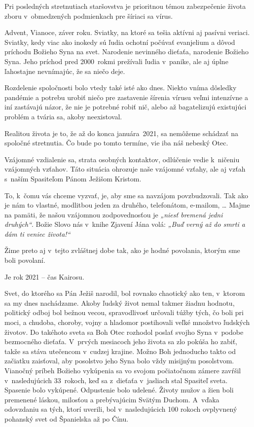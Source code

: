 

Pri posledných stretnutiach staršovstva je prioritnou témou zabezpečenie života zboru v~obmedzených podmienkach pre šíriaci sa vírus.

Advent, Vianoce, záver roku. Sviatky, na ktoré sa tešia aktívni aj pasívni veriaci. Sviatky, kedy viac ako inokedy sú ľudia ochotní počúvať evanjelium a dôvod príchodu Božieho Syna na svet. Narodenie nevinného dieťaťa, narodenie Božieho Syna. Jeho príchod pred 2000~rokmi prežívali ľudia v~panike, ale aj úplne ľahostajne nevnímajúc, že sa niečo deje.

Rozdelenie spoločnosti bolo vtedy také isté ako dnes. Niekto vníma dôsledky pandémie a potrebu urobiť niečo pre zastavenie šírenia vírusu veľmi intenzívne a iní zastávajú názor, že nie je potrebné robiť nič, alebo až bagatelizujú existujúci problém  a tvária sa, akoby neexistoval.

Realitou života je to, že až do konca januára~2021, sa nemôžeme schádzať na spoločné stretnutia. Čo bude po tomto termíne, vie iba náš nebeský Otec.

Vzájomné vzdialenie sa, strata osobných kontaktov, odlúčenie vedie k~ničeniu vzájomných vzťahov. Táto situácia ohrozuje naše vzájomné vzťahy, ale aj vzťah s~naším Spasiteľom Pánom Ježišom Kristom.

To, k~čomu vás chceme vyzvať, je, aby sme sa navzájom povzbudzovali. Tak ako je nám to vlastné, modlitbou jeden za druhého, telefonátom, e-mailom, … Majme na pamäti, že našou vzájomnou zodpovednosťou je {\it „niesť bremená jedni druhých“}. Božie Slovo nás v~knihe Zjavení Jána volá: {\it „Buď verný až do smrti a dám ti veniec života!“}

Žime preto aj v~tejto zvláštnej dobe tak, ako je hodné povolania, ktorým sme boli povolaní.

\vfill\break


Je rok 2021 -- čas Kairosu.

Svet, do ktorého sa Pán Ježiš narodil, bol rovnako chaotický ako ten, v~ktorom sa my dnes nachádzame. Akoby ľudský život nemal takmer žiadnu hodnotu, politický odboj bol bežnou vecou, spravodlivosť určovali túžby tých, čo boli pri moci, a chudoba, choroby, vojny a hladomor postihovali veľké množstvo ľudských životov. Do takéhoto sveta sa Boh Otec rozhodol poslať svojho Syna v~podobe bezmocného dieťaťa. V~prvých mesiacoch jeho života sa zlo pokúša ho zabiť, takže sa stáva utečencom v~cudzej krajine. Možno Boh jednoducho takto od začiatku zaisťoval, aby posolstvo jeho Syna bolo vždy misijným posolstvom. Vianočný príbeh Božieho vykúpenia sa vo svojom počiatočnom zámere zavŕšil v~nasledujúcich 33~rokoch, keď sa z~dieťaťa v~jasliach stal Spasiteľ sveta. Spasenie bolo vykúpené. Odpustenie bolo udelené. Životy mužov a žien boli premenené láskou, milosťou a prebývajúcim Svätým Duchom. A~vďaka odovzdaniu sa tých, ktorí uverili, bol v~nasledujúcich 100 rokoch ovplyvnený pohanský svet od Španielska až po Čínu.

